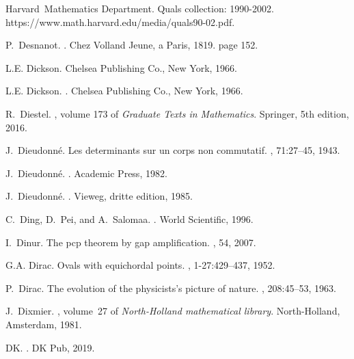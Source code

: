 \documentclass[12pt]{amsart}
\begin{document}
\begin{thebibliography}{100}
Harvard~Mathematics Department.
\newblock Quals collection: 1990-2002.
\newblock https://www.math.harvard.edu/media/quals90-02.pdf.

P.~Desnanot.
.
\newblock Chez Volland Jeune, a Paris, 1819.
\newblock page 152.

L.E. Dickson.
\newblock Chelsea Publishing Co., New York, 1966.

L.E. Dickson.
.
\newblock Chelsea Publishing Co., New York, 1966.

R.~Diestel.
, volume 173 of {\em Graduate Texts in
  Mathematics}.
\newblock Springer, 5th edition, 2016.

J.~Dieudonn{\'e}.
\newblock Les determinants sur un corps non commutatif.
, 71:27--45, 1943.

J.~{Dieudonn\'e}.
.
\newblock Academic Press, 1982.

J.~{Dieudonn\'e}.
.
\newblock Vieweg, dritte edition, 1985.

C.~Ding, D.~Pei, and A.~Salomaa.
.
\newblock World Scientific, 1996.

I.~Dinur.
\newblock The pcp theorem by gap amplification.
, 54, 2007.

G.A. Dirac.
\newblock Ovals with equichordal points.
, 1-27:429--437,
  1952.

P.~Dirac.
\newblock The evolution of the physicists's picture of nature.
, 208:45--53, 1963.

J.~Dixmier.
, volume~27 of {\em North-Holland
  mathematical library}.
\newblock North-Holland, Amsterdam, 1981.

DK.
.
\newblock DK Pub, 2019.


\end{thebibliography}
\end{document}
